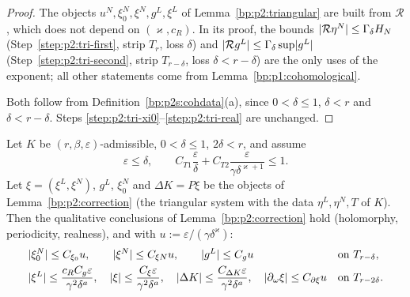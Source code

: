 \begin{proof}
\label{step:p2s:tri-where}
The objects $u^N,\xi^N_0,\xi^N,g^L,\xi^L$ of Lemma~\ref{bp:p2:triangular} are built from $\mathcal R$, which does not depend
on $(\varkappa,c_R)$. In its proof, the bounds $\lvert \mathcal R\eta^N\rvert\le\Gamma_\delta H_N$ (Step~\ref{step:p2:tri-first}, strip
$T_r$, loss $\delta$) and $\lvert \mathcal Rg^L\rvert\le\Gamma_\delta\sup\lvert g^L\rvert$ (Step~\ref{step:p2:tri-second}, strip $T_{r-\delta}$, loss
$\delta<r-\delta$) are the only uses of the exponent; all other statements come from Lemma~\ref{bp:p1:cohomological}.

\label{step:p2s:tri-bounds}
Both follow from Definition~\ref{bp:p2s:cohdata}(a), since $0<\delta\le1$, $\delta<r$ and $\delta<r-\delta$. Steps
\ref{step:p2:tri-xi0}--\ref{step:p2:tri-real} are unchanged.
\end{proof}

\begin{lemma}\label{bp:p2s:correction}
Let $K$ be $(r,\beta,\varepsilon)$-admissible, $0<\delta\le1$, $2\delta<r$, and assume
\[
\varepsilon\le\delta,\qquad C_{T1}\frac\varepsilon\delta+C_{T2}\frac\varepsilon{\gamma\delta^{\varkappa+1}}\le1.
\]
Let $\xi=(\xi^L,\xi^N)$, $g^L$, $\xi^N_0$ and $\Delta K=P\xi$ be the objects of Lemma~\ref{bp:p2:correction} (the triangular
system with the data $\eta^L,\eta^N,T$ of $K$). Then the qualitative conclusions of Lemma~\ref{bp:p2:correction} hold
(holomorphy, periodicity, realness), and with $u:=\varepsilon/(\gamma\delta^\varkappa)$:
\begin{align*}
&\lvert \xi^N_0\rvert\le C_{\xi_0}u,\qquad\lvert \xi^N\rvert\le C_{\xi N}u,\qquad\lvert g^L\rvert\le C_gu&&\text{on }T_{r-\delta},\\
&\lvert \xi^L\rvert\le\frac{c_RC_g\varepsilon}{\gamma^2\delta^a},\quad\lvert \xi\rvert\le\frac{C_\xi\varepsilon}{\gamma^2\delta^a},\quad
\lvert \Delta K\rvert\le\frac{C_{\Delta K}\varepsilon}{\gamma^2\delta^a},\quad\lvert \partial_\omega\xi\rvert\le C_{\partial\xi}u&&\text{on }T_{r-2\delta}.
\end{align*}
\end{lemma}


